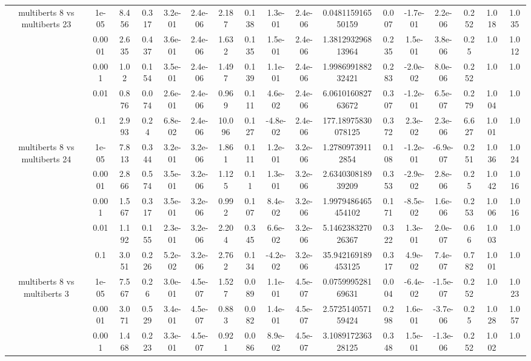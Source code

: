 \begin{tabular}{|c|c|c|c|c|c|c|c|c|c|c|c|c|c|c|c|c|}
\hline
\multirow{5}{*}{multiberts 8 vs multiberts 23} & 1e-05 & 8.456 & 0.317 & 3.2e-01 & 2.4e-06 & 2.187 & 0.138 & 1.3e-01 & 2.4e-06 & 0.048115916550159 & 0.007 & -1.7e-01 & 2.2e-06 & 0.252 & 1.018 & 1.035 \\
 & 0.0001 & 2.635 & 0.437 & 3.6e-01 & 2.4e-06 & 1.632 & 0.135 & 1.5e-01 & 2.4e-06 & 1.381293296813964 & 0.235 & 1.5e-01 & 3.8e-06 & 0.25 & 1.0 & 1.012 \\
 & 0.001 & 1.02 & 0.154 & 3.5e-01 & 2.4e-06 & 1.497 & 0.139 & 1.1e-01 & 2.4e-06 & 1.998699188232421 & 0.283 & -2.0e-02 & 8.0e-06 & 0.252 & 1.0 & 1.0 \\
 & 0.01 & 0.876 & 0.074 & 2.6e-01 & 2.4e-06 & 0.969 & 0.111 & 4.6e-02 & 2.4e-06 & 6.061016082763672 & 0.307 & -1.2e-01 & 6.5e-07 & 0.279 & 1.004 & 1.0 \\
 & 0.1 & 2.993 & 0.24 & 6.8e-02 & 2.4e-06 & 10.096 & 0.127 & -4.8e-02 & 2.4e-06 & 177.18975830078125 & 0.372 & 2.3e-02 & 2.3e-06 & 6.627 & 1.001 & 1.0 \\
\hline
\multirow{5}{*}{multiberts 8 vs multiberts 24} & 1e-05 & 7.813 & 0.344 & 3.2e-01 & 3.2e-06 & 1.861 & 0.111 & 1.2e-01 & 3.2e-06 & 1.27809739112854 & 0.108 & -1.2e-01 & -6.9e-07 & 0.251 & 1.036 & 1.024 \\
 & 0.0001 & 2.866 & 0.574 & 3.5e-01 & 3.2e-06 & 1.125 & 0.11 & 1.3e-01 & 3.2e-06 & 2.634030818939209 & 0.353 & -2.9e-02 & 2.8e-06 & 0.25 & 1.042 & 1.016 \\
 & 0.001 & 1.567 & 0.317 & 3.5e-01 & 3.2e-06 & 0.992 & 0.107 & 8.4e-02 & 3.2e-06 & 1.9979486465454102 & 0.171 & -8.5e-02 & 1.6e-06 & 0.253 & 1.006 & 1.016 \\
 & 0.01 & 1.192 & 0.155 & 2.3e-01 & 3.2e-06 & 2.204 & 0.345 & 6.6e-02 & 3.2e-06 & 5.146238327026367 & 0.322 & 1.3e-01 & 2.0e-07 & 0.66 & 1.003 & 1.0 \\
 & 0.1 & 3.051 & 0.226 & 5.2e-02 & 3.2e-06 & 2.762 & 0.134 & -4.2e-02 & 3.2e-06 & 35.942169189453125 & 0.317 & 4.9e-02 & 7.4e-07 & 0.782 & 1.001 & 1.0 \\
\hline
\multirow{5}{*}{multiberts 8 vs multiberts 3} & 1e-05 & 7.567 & 0.26 & 3.0e-01 & 4.5e-07 & 1.527 & 0.089 & 1.1e-01 & 4.5e-07 & 0.075999528169631 & 0.004 & -6.4e-02 & -1.5e-07 & 0.252 & 1.0 & 1.023 \\
 & 0.0001 & 3.071 & 0.529 & 3.4e-01 & 4.5e-07 & 0.883 & 0.082 & 1.4e-01 & 4.5e-07 & 2.572514057159424 & 0.298 & 1.6e-01 & -3.7e-06 & 0.25 & 1.028 & 1.057 \\
 & 0.001 & 1.468 & 0.223 & 3.3e-01 & 4.5e-07 & 0.921 & 0.086 & 8.9e-02 & 4.5e-07 & 3.108917236328125 & 0.348 & 1.5e-01 & -1.3e-06 & 0.252 & 1.002 & 1.0 \\

\end{tabular}

